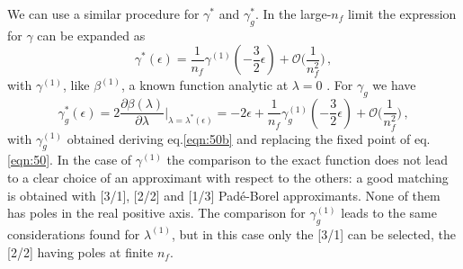 \documentclass [11pt]{article}
\begin{document}
We can use a similar procedure for $\gamma^*$ and $\gamma_g^*$. In the large-$n_f$ limit the expression for $\gamma$ can be expanded as
\begin{equation} 
\gamma^*(\epsilon)=\frac{1}{n_f}\gamma^{(1)}\left(-\frac{3}{2}\epsilon\right)+\mathcal{O}\biggl(\frac{1}{n_f^2}\biggr)\,,
\end{equation}
with $\gamma^{(1)}$, like $\beta^{(1)}$, a known function analytic at $\lambda = 0$ \cite{Espriu:1982pb,PalanquesMestre:1983zy}.
For $\gamma_g$ we have
\begin{equation} 
\gamma_g^*(\epsilon)=2\frac{\partial \beta(\lambda)}{\partial\lambda}\bigg|_{\lambda=\lambda^*(\epsilon)}=-2\epsilon+\frac{1}{n_f}\gamma_g^{(1)}\left(-\frac{3}{2}\epsilon\right)+\mathcal{O}\biggl(\frac{1}{n_f^2}\biggr)\,, 
\end{equation}
with $\gamma^{(1)}_g$ obtained deriving eq.\eqref{eqn:50b} and replacing the fixed point of eq.\eqref{eqn:50}. In the case of $\gamma^{(1)}$ the comparison to the exact function does not lead to a clear choice of an approximant with respect to the others: a good matching is obtained with [3/1], [2/2] and [1/3] Pad\'e-Borel approximants. None of them has poles in the real positive axis. The comparison for $\gamma_g^{(1)}$ leads to the same considerations found for $\lambda^{(1)}$, but in this case only the [3/1] can be selected, the [2/2] having poles at finite $n_f$.
\end{document}
